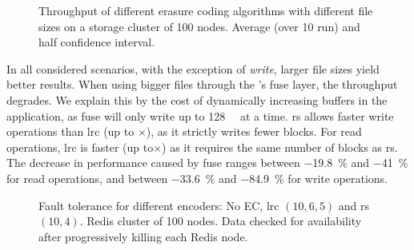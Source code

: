 \begin{figure*}[t]
    \centering
    
    \caption{Throughput of different erasure coding algorithms with different file sizes on a storage cluster of 100 nodes. Average (over 10 run) and half confidence interval.}
    \label{fig:throughput-plot}
\end{figure*}

In all considered scenarios, with the exception of \SYS \textit{write}, larger file sizes yield better results.
When using bigger files through the \SYS's \ac{fuse} layer, the throughput degrades.
We explain this by the cost of dynamically increasing buffers in the application, as \ac{fuse} will only write up to \SI{128}{\kibi\byte} at a time.
\ac{rs} allows faster write operations than \ac{lrc} (up to $\times$), as it strictly writes fewer blocks.
For read operations, \ac{lrc} is faster (up to$\times$) as it requires the same number of blocks as \ac{rs}.
The decrease in performance caused by \ac{fuse} ranges between \SI{-19.8}{\percent} and \SI{-41}{\percent} for read operations, and between \SI{-33.6}{\percent} and \SI{-84.9}{\percent} for write operations.

\begin{figure}[t]
    \centering
    
    \caption{Fault tolerance for different encoders: No EC, \ac{lrc} $\left(10,6,5\right)$ and \ac{rs} $\left(10,4\right)$. Redis cluster of 100 nodes. Data checked for availability after progressively killing each Redis node.}
    \label{fig:checksum-plot}
\end{figure}

%


